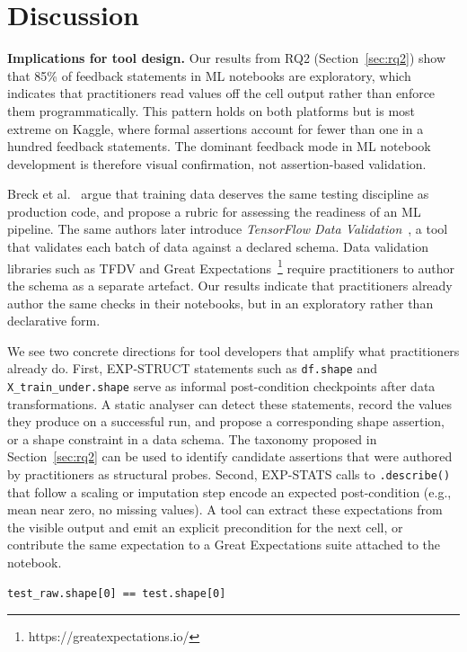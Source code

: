 \documentclass[a4paper,USenglish,cleveref,autoref,thm-restate,anonymous]{lipics-v2021}       %
\begin{document}
\section{Discussion}

\textbf{Implications for tool design.}
Our results from RQ2 (Section~\ref{sec:rq2})
show that 85\% of feedback statements in ML notebooks are exploratory,
which indicates that practitioners read values off the cell output
rather than enforce them programmatically.
This pattern holds on both platforms
but is most extreme on Kaggle,
where formal assertions account for fewer than one in a hundred feedback statements.
The dominant feedback mode in ML notebook development
is therefore visual confirmation, not assertion-based validation.

Breck et al.~\cite{breck2017ml} argue
that training data deserves the same testing discipline as production code,
and propose a rubric for assessing the readiness of an ML pipeline.
The same authors later introduce \emph{TensorFlow Data Validation}~\cite{breck2019data},
a tool that validates each batch of data against a declared schema.
Data validation libraries such as TFDV and Great Expectations~\footnote{https://greatexpectations.io/}
require practitioners to author the schema as a separate artefact.
Our results indicate that
practitioners already author the same checks in their notebooks,
but in an exploratory rather than declarative form.

We see two concrete directions for tool developers
that amplify what practitioners already do.
First,
EXP-STRUCT statements
such as \lstinline{df.shape} and \lstinline{X_train_under.shape}
serve as informal post-condition checkpoints after data transformations.
A static analyser can detect these statements,
record the values they produce on a successful run,
and propose a corresponding shape assertion,
or a shape constraint in a data schema.
The taxonomy proposed in Section~\ref{sec:rq2}
can be used to identify candidate assertions
that were authored by practitioners as structural probes.
Second,
EXP-STATS calls to \lstinline{.describe()}
that follow a scaling or imputation step
encode an expected post-condition (e.g., mean near zero, no missing values).
A tool can extract these expectations from the visible output
and emit an explicit precondition for the next cell,
or contribute the same expectation
to a Great Expectations suite attached to the notebook.

\begin{lstlisting}[caption={A last-cell boolean expression
that verifies no rows were lost during a transformation.}, label={lst:480}]
test_raw.shape[0] == test.shape[0]
\end{lstlisting}
\end{document}
